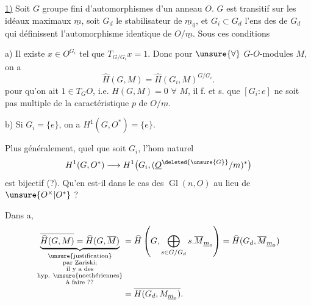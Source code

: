 
\uline{1)} Soit $G$ groupe fini d'automorphismes d'un anneau  $O$.
$G$ est transitif sur les idéaux maximaux $\underline m$, soit $G_d$ le stabilisateur de $\underline m_0$, et $G_i\subset G_d$ l'ens des  de $G_d$ qui définissent l'automorphisme identique de $O/\underline m$.
Sous ces conditions

a) Il existe $x\in O^{G_i}$ tel que $T_{G/G_i}x=1$. Donc pour $\unsure{\forall}$ $G$-$O$-modules $M$, on a
\[
\widehat H(G,M)=\widehat H(G_i,M)^{G/G_i}.
\]
 pour qu'on ait $1\in T_G O$, i.e. $\widehat H(G,M)=0$ $\forall$ $M$, il f. et s. que $[G_i:e]$ ne soit pas multiple de la caractéristique $p$ de $O/\underline m$.

b) Si $G_i=\{e\}$, on a $H^1(G,O^*)=\{e\}$.

Plus généralement, quel que soit $G_i$, l'hom naturel
\[
H^1(G,O^*)\longrightarrow H^1\bigl(G_i,(\underline O^{\deleted{\unsure{G}}}/m)^*\bigr)
\]
est bijectif (?). Qu'en est-il dans le cas  des $\operatorname{Gl}(n,\underline O)$ au lieu de $\unsure{O^\times|O^*}$ ?

Dans a, 
\[
\begin{aligned}
\underbrace{\overline{\widehat H(G,M)}=\widehat H(G,\overline M)}_{\substack{\text{\unsure{justification}}\\\text{par Zariski;}\\\text{il y a des}\\\text{hyp. \unsure{noethériennes}}\\\text{à faire ??}}}
&=\widehat H\left(G,\bigoplus_{s\in G/G_d}s.\overline M_{\underline m_0}\right)
=\widehat H(G_d,\overline M_{\underline m_0})\\
&=\overline{H(G_d,M_{\underline m_0})}.
\end{aligned}
\]

